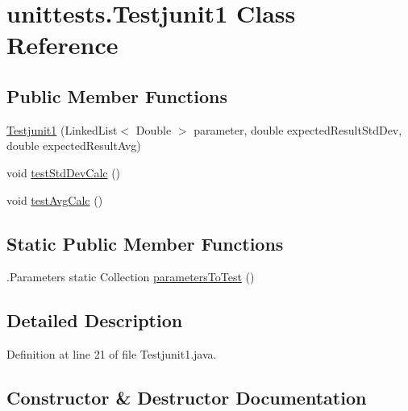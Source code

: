 \hypertarget{classunittests_1_1_testjunit1}{}\section{unittests.\+Testjunit1 Class Reference}
\label{classunittests_1_1_testjunit1}
\subsection*{Public Member Functions}
\begin{DoxyCompactItemize}
\item 
\hyperlink{classunittests_1_1_testjunit1_ab9b56c0754e0cac4b65c466b21372015}{Testjunit1} (Linked\+List$<$ Double $>$ parameter, double expected\+Result\+Std\+Dev, double expected\+Result\+Avg)
\item 
void \hyperlink{classunittests_1_1_testjunit1_a0d8d17ba74c353e33339cd9abdb9a85b}{test\+Std\+Dev\+Calc} ()
\item 
void \hyperlink{classunittests_1_1_testjunit1_a622923ae23252a93c4926cf21952f3b0}{test\+Avg\+Calc} ()
\end{DoxyCompactItemize}
\subsection*{Static Public Member Functions}
\begin{DoxyCompactItemize}
\item 
.Parameters static Collection \hyperlink{classunittests_1_1_testjunit1_aabef7b871ed456bd558ac96cc1d775e2}{parameters\+To\+Test} ()
\end{DoxyCompactItemize}


\subsection{Detailed Description}


Definition at line 21 of file Testjunit1.\+java.



\subsection{Constructor \& Destructor Documentation}
\hypertarget{classunittests_1_1_testjunit1_ab9b56c0754e0cac4b65c466b21372015}{}\label{classunittests_1_1_testjunit1_ab9b56c0754e0cac4b65c466b21372015} 
